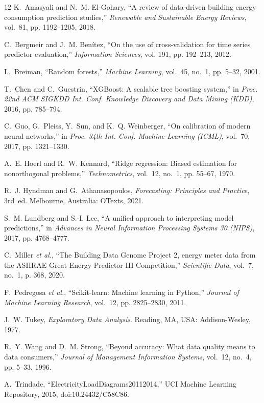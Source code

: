 \documentclass[conference]{IEEEtran}
\begin{document}
\begin{thebibliography}{12}
K.~Amasyali and N.~M. El-Gohary, ``A review of data-driven building energy consumption prediction studies,'' \emph{Renewable and Sustainable Energy Reviews}, vol.~81, pp. 1192--1205, 2018.

C.~Bergmeir and J.~M. Ben\'{i}tez, ``On the use of cross-validation for time series predictor evaluation,'' \emph{Information Sciences}, vol. 191, pp. 192--213, 2012.

L.~Breiman, ``Random forests,'' \emph{Machine Learning}, vol.~45, no.~1, pp. 5--32, 2001.

T.~Chen and C.~Guestrin, ``XGBoost: A scalable tree boosting system,'' in \emph{Proc. 22nd ACM SIGKDD Int. Conf. Knowledge Discovery and Data Mining (KDD)}, 2016, pp. 785--794.

C.~Guo, G.~Pleiss, Y.~Sun, and K.~Q. Weinberger, ``On calibration of modern neural networks,'' in \emph{Proc. 34th Int. Conf. Machine Learning (ICML)}, vol.~70, 2017, pp. 1321--1330.

A.~E. Hoerl and R.~W. Kennard, ``Ridge regression: Biased estimation for nonorthogonal problems,'' \emph{Technometrics}, vol.~12, no.~1, pp. 55--67, 1970.

R.~J. Hyndman and G.~Athanasopoulos, \emph{Forecasting: Principles and Practice}, 3rd~ed. Melbourne, Australia: OTexts, 2021.

S.~M. Lundberg and S.-I. Lee, ``A unified approach to interpreting model predictions,'' in \emph{Advances in Neural Information Processing Systems 30 (NIPS)}, 2017, pp. 4768--4777.

C.~Miller \emph{et al.}, ``The Building Data Genome Project 2, energy meter data from the ASHRAE Great Energy Predictor III Competition,'' \emph{Scientific Data}, vol.~7, no.~1, p. 368, 2020.

F.~Pedregosa \emph{et al.}, ``Scikit-learn: Machine learning in Python,'' \emph{Journal of Machine Learning Research}, vol.~12, pp. 2825--2830, 2011.

J.~W. Tukey, \emph{Exploratory Data Analysis}. Reading, MA, USA: Addison-Wesley, 1977.

R.~Y. Wang and D.~M. Strong, ``Beyond accuracy: What data quality means to data consumers,'' \emph{Journal of Management Information Systems}, vol.~12, no.~4, pp. 5--33, 1996.

A.~Trindade, ``ElectricityLoadDiagrams20112014,'' UCI Machine Learning Repository, 2015, doi:10.24432/C58C86.
\end{thebibliography}
\end{document}
